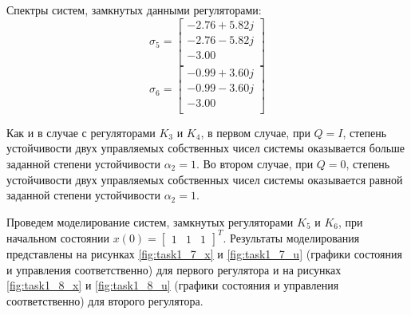 Спектры систем, замкнутых данными регуляторами:
\begin{equation}
    \sigma_5 = \begin{bmatrix}
        -2.76 + 5.82j \\ 
        -2.76 - 5.82j \\ 
        -3.00 \\ 
    \end{bmatrix}
\end{equation}
\begin{equation}
    \sigma_6 = \begin{bmatrix}
        -0.99 + 3.60j \\ 
        -0.99 - 3.60j \\ 
        -3.00 \\ 
    \end{bmatrix}
\end{equation}

Как и в случае с регуляторами $K_3$ и $K_4$, в первом случае, при $Q = I$, степень устойчивости двух управляемых собственных чисел системы
оказывается больше заданной степени устойчивости $\alpha_2 = 1$. Во втором случае, при $Q = 0$,
степень устойчивости двух управляемых собственных чисел системы оказывается равной заданной степени устойчивости $\alpha_2 = 1$.

Проведем моделирование систем, замкнутых регуляторами $K_5$ и $K_6$,
при начальном состоянии $x(0) = \begin{bmatrix}1 & 1 & 1\end{bmatrix}^T$.
Результаты моделирования представлены на рисунках \ref{fig:task1_7_x} и \ref{fig:task1_7_u} 
(графики состояния и управления соответственно) для первого регулятора и на рисунках \ref{fig:task1_8_x} и \ref{fig:task1_8_u} 
(графики состояния и управления соответственно) для второго регулятора.

